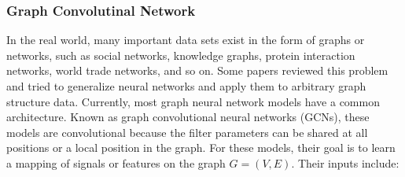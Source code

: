 \subsubsection{Graph Convolutinal Network}






In the real world, many important data sets exist in the form of graphs or networks, such as social networks, knowledge graphs, protein interaction networks, world trade networks, and so on. Some papers reviewed this problem and tried to generalize neural networks and apply them to arbitrary graph structure data\cite{wu2018socialgcn,dettmers2018convolutional}. Currently, most graph neural network models have a common architecture. Known as graph convolutional neural networks (GCNs), these models are convolutional because the filter parameters can be shared at all positions or a local position in the graph. For these models, their goal is to learn a mapping of signals or features on the graph $G=(V,E)$. Their inputs include:

